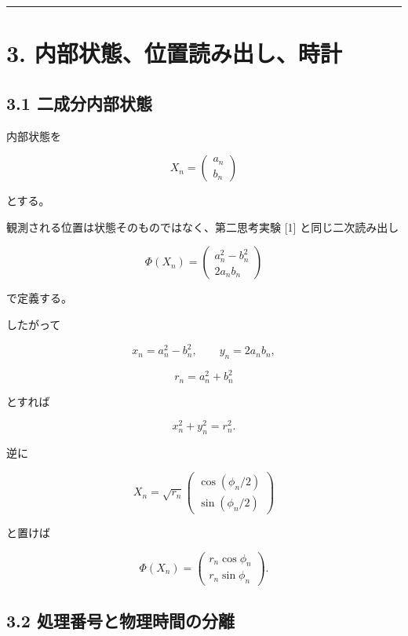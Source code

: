 \documentclass[
  a4paper,
]{ltjsarticle}
\begin{document}
\begin{center}\rule{0.5\linewidth}{0.5pt}\end{center}

\section{3.
内部状態、位置読み出し、時計}\label{ux5185ux90e8ux72b6ux614bux4f4dux7f6eux8aadux307fux51faux3057ux6642ux8a08}

\subsection{3.1
二成分内部状態}\label{ux4e8cux6210ux5206ux5185ux90e8ux72b6ux614b}

内部状態を

\[
X_n=
\begin{pmatrix}
a_n\\
b_n
\end{pmatrix}
\]

とする。

観測される位置は状態そのものではなく、第二思考実験 {[}1{]}
と同じ二次読み出し

\[
\Phi(X_n)
=
\begin{pmatrix}
a_n^2-b_n^2\\
2a_nb_n
\end{pmatrix}
\]

で定義する。

したがって

\[
x_n=a_n^2-b_n^2,
\qquad
y_n=2a_nb_n,
\]

\[
r_n=a_n^2+b_n^2
\]

とすれば

\[
x_n^2+y_n^2=r_n^2.
\]

逆に

\[
X_n=
\sqrt{r_n}
\begin{pmatrix}
\cos(\phi_n/2)\\
\sin(\phi_n/2)
\end{pmatrix}
\]

と置けば

\[
\Phi(X_n)
=
\begin{pmatrix}
r_n\cos\phi_n\\
r_n\sin\phi_n
\end{pmatrix}.
\]

\subsection{3.2
処理番号と物理時間の分離}\label{ux51e6ux7406ux756aux53f7ux3068ux7269ux7406ux6642ux9593ux306eux5206ux96e2}
\end{document}
